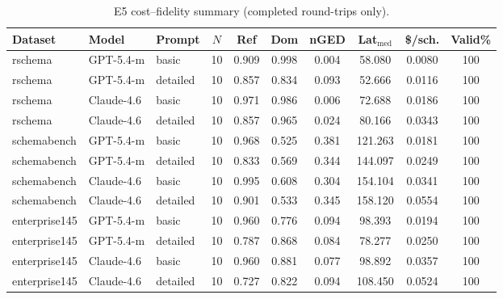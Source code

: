 \begin{table}[t]
\centering
\caption{E5 cost--fidelity summary (completed round-trips only).}
\label{tab:e5_cost_fidelity}
\footnotesize
\begin{tabular}{@{}l l l c ccc cc c@{}}
\toprule
Dataset & Model & Prompt & $N$ & Ref & Dom & nGED & Lat$_\mathrm{med}$ & \$/sch. & Valid\% \\
\midrule
rschema & GPT-5.4-m & basic & 10 & 0.909 & 0.998 & 0.004 & 58.080 & 0.0080 & 100 \\
rschema & GPT-5.4-m & detailed & 10 & 0.857 & 0.834 & 0.093 & 52.666 & 0.0116 & 100 \\
rschema & Claude-4.6 & basic & 10 & 0.971 & 0.986 & 0.006 & 72.688 & 0.0186 & 100 \\
rschema & Claude-4.6 & detailed & 10 & 0.857 & 0.965 & 0.024 & 80.166 & 0.0343 & 100 \\
schemabench & GPT-5.4-m & basic & 10 & 0.968 & 0.525 & 0.381 & 121.263 & 0.0181 & 100 \\
schemabench & GPT-5.4-m & detailed & 10 & 0.833 & 0.569 & 0.344 & 144.097 & 0.0249 & 100 \\
schemabench & Claude-4.6 & basic & 10 & 0.995 & 0.608 & 0.304 & 154.104 & 0.0341 & 100 \\
schemabench & Claude-4.6 & detailed & 10 & 0.901 & 0.533 & 0.345 & 158.120 & 0.0554 & 100 \\
enterprise145 & GPT-5.4-m & basic & 10 & 0.960 & 0.776 & 0.094 & 98.393 & 0.0194 & 100 \\
enterprise145 & GPT-5.4-m & detailed & 10 & 0.787 & 0.868 & 0.084 & 78.277 & 0.0250 & 100 \\
enterprise145 & Claude-4.6 & basic & 10 & 0.960 & 0.881 & 0.077 & 98.892 & 0.0357 & 100 \\
enterprise145 & Claude-4.6 & detailed & 10 & 0.727 & 0.822 & 0.094 & 108.450 & 0.0524 & 100 \\
\bottomrule
\end{tabular}
\end{table}